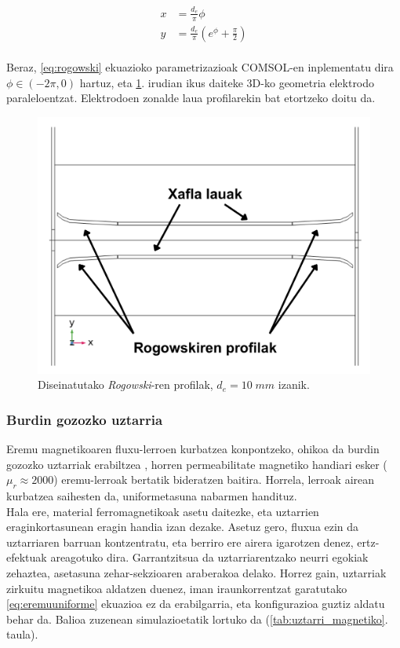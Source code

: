 \documentclass[12pt]{article}
\numberwithin{figure}{section}
\numberwithin{equation}{section}
\begin{document}
\begin{equation}
    \begin{aligned}
        x &= \frac{d_e}{\pi}\phi\\
        y &= \frac{d_e}{\pi}(e^\phi+\frac{\pi}{2})
    \end{aligned}
    \label{eq:rogowski}
\end{equation}\\

Beraz, \ref{eq:rogowski} ekuazioko parametrizazioak COMSOL-en inplementatu dira $\phi \in (-2\pi, 0)$ hartuz, eta \ref{fig:rogowski_wien}. irudian ikus daiteke 3D-ko geometria elektrodo paraleloentzat. Elektrodoen zonalde laua profilarekin bat etortzeko doitu da.

\begin{figure}[h]
    \centering
    \includegraphics[width=0.6\linewidth]{4 - Diseinua/rogowski_profilak_wien.png}
    \caption{Diseinatutako \textit{Rogowski}-ren profilak, $d_e=10\;mm$ izanik.}
    \label{fig:rogowski_wien}
\end{figure}

\subsubsection{Burdin gozozko uztarria}

Eremu magnetikoaren fluxu-lerroen kurbatzea konpontzeko, ohikoa da burdin gozozko uztarriak erabiltzea \cite{peng_enhance_2023}, horren permeabilitate magnetiko handiari esker ($\mu_r\approx2000$) eremu-lerroak bertatik bideratzen baitira. Horrela, lerroak airean kurbatzea saihesten da, uniformetasuna nabarmen handituz.\\

Hala ere, material ferromagnetikoak asetu daitezke, eta uztarrien eraginkortasunean eragin handia izan dezake. Asetuz gero, fluxua ezin da uztarriaren barruan kontzentratu, eta berriro ere airera igarotzen denez, ertz-efektuak areagotuko dira. Garrantzitsua da uztarriarentzako neurri egokiak zehaztea, asetasuna zehar-sekzioaren araberakoa delako. Horrez gain, uztarriak zirkuitu magnetikoa aldatzen duenez, iman iraunkorrentzat garatutako \ref{eq:eremuuniforme} ekuazioa ez da erabilgarria, eta konfigurazioa guztiz aldatu behar da. Balioa zuzenean simulazioetatik lortuko da (\ref{tab:uztarri_magnetiko}. taula).\\
\end{document}

